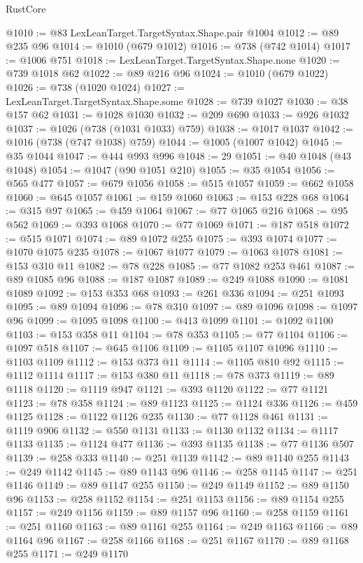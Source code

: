 \begin{lexlean}{RustCore}
\begin{coremodule}
@1010 := @83 LexLeanTarget.TargetSyntax.Shape.pair @1004
@1012 := @89 @235 @96
@1014 := @1010 (@679 @1012)
@1016 := @738 (@742 @1014)
@1017 := @1006 @751
@1018 := LexLeanTarget.TargetSyntax.Shape.none
@1020 := @739 @1018 @62
@1022 := @89 @216 @96
@1024 := @1010 (@679 @1022)
@1026 := @738 (@1020 @1024)
@1027 := LexLeanTarget.TargetSyntax.Shape.some
@1028 := @739 @1027
@1030 := @38 @157 @62
@1031 := @1028 @1030
@1032 := @209 @690
@1033 := @926 @1032
@1037 := @1026 (@738 (@1031 @1033) @759)
@1038 := @1017 @1037
@1042 := @1016 (@738 (@747 @1038) @759)
@1044 := @1005 (@1007 @1042)
@1045 := @35 @1044
@1047 := @444 @993 @996
@1048 := 29
@1051 := @40 @1048 (@43 @1048)
@1054 := @1047 (@90 @1051 @210)
@1055 := @35 @1054
@1056 := @565 @477
@1057 := @679 @1056
@1058 := @515 @1057
@1059 := @662 @1058
@1060 := @645 @1057
@1061 := @159 @1060
@1063 := @153 @228 @68
@1064 := @315 @97
@1065 := @459 @1064
@1067 := @77 @1065 @216
@1068 := @95 @562
@1069 := @393 @1068
@1070 := @77 @1069
@1071 := @187 @518
@1072 := @515 @1071
@1074 := @89 @1072 @255
@1075 := @393 @1074
@1077 := @1070 @1075 @235
@1078 := @1067 @1077
@1079 := @1063 @1078
@1081 := @153 @310 @11
@1082 := @78 @228
@1085 := @77 @1082 @253 @461
@1087 := @89 @1085 @96
@1088 := @187 @1087
@1089 := @249 @1088
@1090 := @1081 @1089
@1092 := @153 @353 @68
@1093 := @261 @336
@1094 := @251 @1093
@1095 := @89 @1094
@1096 := @78 @310
@1097 := @89 @1096
@1098 := @1097 @96
@1099 := @1095 @1098
@1100 := @413 @1099
@1101 := @1092 @1100
@1103 := @153 @358 @11
@1104 := @78 @353
@1105 := @77 @1104
@1106 := @1097 @518
@1107 := @645 @1106
@1109 := @1105 @1107 @1096
@1110 := @1103 @1109
@1112 := @153 @373 @11
@1114 := @1105 @810 @92
@1115 := @1112 @1114
@1117 := @153 @380 @11
@1118 := @78 @373
@1119 := @89 @1118
@1120 := @1119 @947
@1121 := @393 @1120
@1122 := @77 @1121
@1123 := @78 @358
@1124 := @89 @1123
@1125 := @1124 @336
@1126 := @459 @1125
@1128 := @1122 @1126 @235
@1130 := @77 @1128 @461
@1131 := @1119 @906
@1132 := @550 @1131
@1133 := @1130 @1132
@1134 := @1117 @1133
@1135 := @1124 @477
@1136 := @393 @1135
@1138 := @77 @1136 @507
@1139 := @258 @333
@1140 := @251 @1139
@1142 := @89 @1140 @255
@1143 := @249 @1142
@1145 := @89 @1143 @96
@1146 := @258 @1145
@1147 := @251 @1146
@1149 := @89 @1147 @255
@1150 := @249 @1149
@1152 := @89 @1150 @96
@1153 := @258 @1152
@1154 := @251 @1153
@1156 := @89 @1154 @255
@1157 := @249 @1156
@1159 := @89 @1157 @96
@1160 := @258 @1159
@1161 := @251 @1160
@1163 := @89 @1161 @255
@1164 := @249 @1163
@1166 := @89 @1164 @96
@1167 := @258 @1166
@1168 := @251 @1167
@1170 := @89 @1168 @255
@1171 := @249 @1170

\end{coremodule}
\end{lexlean}
